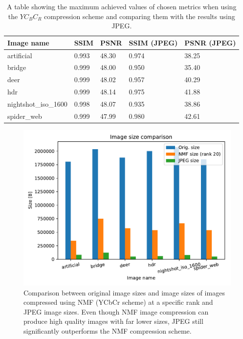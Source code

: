 \documentclass[thesis=M,english]{FITthesis}[2012/10/20]
\begin{document}
\begin{table}[]
\centering
\begin{tabular}{|l|l|l|l|l|}
\hline
\textbf{Image name}  & \textbf{SSIM} & \textbf{PSNR} & \textbf{SSIM (JPEG)} & \textbf{PSNR (JPEG)} \\ \hline
artificial           & 0.993             & 48.30             & 0.974                & 38.25                \\ \hline
bridge               & 0.999             & 48.00             & 0.950                & 35.40                \\ \hline
deer                 & 0.999             & 48.02             & 0.957                & 40.29                \\ \hline
hdr                  & 0.999             & 48.14             & 0.975                & 41.88                \\ \hline
nightshot\_iso\_1600 & 0.998             & 48.07             & 0.935                & 38.86                \\ \hline
spider\_web          & 0.999             & 47.99             & 0.980                & 42.61                \\ \hline
\end{tabular}
\caption{A table showing the maximum achieved values of chosen metrics when using
         the $YC_BC_R$ compression scheme and comparing them with the results using
         JPEG.}
\label{tab:ycbcrvsjpeg}
\end{table}

\begin{figure}
  \centering
  \includegraphics[scale=0.8]{imgs/results/filesize_comparison}
  \caption{Comparison between original image sizes and image sizes of images compressed using NMF (YCbCr scheme)
           at a specific rank and JPEG image sizes. Even though NMF image compression can produce
           high quality images with far lower sizes, JPEG still significantly outperforms the NMF
           compression scheme.}
  \label{fig:filesize_comparison}
\end{figure}
\end{document}

